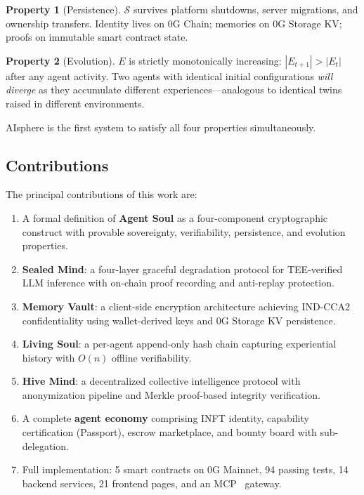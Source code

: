 \documentclass[10pt,a4paper]{article}
\theoremstyle{definition}
\newtheorem{property}{Property}[section]
\theoremstyle{plain}
\begin{document}
\begin{property}[Persistence]\label{prop:persistence}
$\mathcal{S}$ survives platform shutdowns, server migrations, and ownership transfers. Identity lives on 0G Chain; memories on 0G Storage KV; proofs on immutable smart contract state.
\end{property}

\begin{property}[Evolution]\label{prop:evolution}
$E$ is strictly monotonically increasing: $|E_{t+1}| > |E_t|$ after any agent activity. Two agents with identical initial configurations \emph{will diverge} as they accumulate different experiences---analogous to identical twins raised in different environments.
\end{property}

AIsphere is the first system to satisfy all four properties simultaneously.

\subsection{Contributions}

The principal contributions of this work are:

\begin{enumerate}[leftmargin=1.8em, itemsep=2pt, parsep=0pt]
  \item A formal definition of \textbf{Agent Soul} as a four-component cryptographic construct with provable sovereignty, verifiability, persistence, and evolution properties.
  \item \textbf{Sealed Mind}: a four-layer graceful degradation protocol for TEE-verified LLM inference with on-chain proof recording and anti-replay protection.
  \item \textbf{Memory Vault}: a client-side encryption architecture achieving IND-CCA2 confidentiality using wallet-derived keys and 0G Storage KV persistence.
  \item \textbf{Living Soul}: a per-agent append-only hash chain capturing experiential history with $O(n)$ offline verifiability.
  \item \textbf{Hive Mind}: a decentralized collective intelligence protocol with anonymization pipeline and Merkle proof-based integrity verification.
  \item A complete \textbf{agent economy} comprising INFT identity, capability certification (Passport), escrow marketplace, and bounty board with sub-delegation.
  \item Full implementation: 5 smart contracts on 0G Mainnet, 94 passing tests, 14 backend services, 21 frontend pages, and an MCP~\cite{mcp2024, mcp-security2025} gateway.
\end{enumerate}
\end{document}
